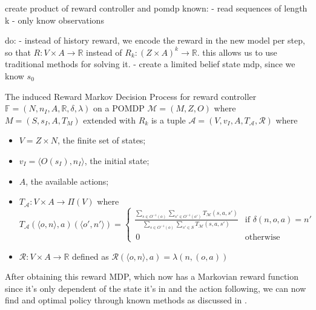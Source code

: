 create product of reward controller and pomdp
known:
- read sequences of length k
- only know observations

do:
- instead of history reward, we encode the reward in the new model per step, so that $R:V\times A\to \mathbb{R}$ instead of $R_k:(Z\times A)^k\to \mathbb{R}$. this allows us to use traditional methods for solving it.
- create a limited belief state mdp, since we know $s_0$ 

\begin{definition}
	\label{def:reward_machine}
	The induced Reward Markov Decision Process for reward controller $\mathbb{F}=(N, n_I, A, \mathbb{R}, \delta, \lambda)$ on a POMDP $\mathcal{M}=(M,Z,O)$ where $M=(S,s_I,A,T_{M})$ extended with $R_k$ is a tuple $\mathcal{A}=(V,v_I,A,T_\mathcal{A},\mathcal{R})$ where 
	\begin{itemize}
		\item $V=Z\times N$, the finite set of states;
		\item $v_I=\langle O(s_I),n_I\rangle $, the initial state;
		\item $A$, the available actions;
		\item $T_\mathcal{A}: V \times A\to \Pi(V)$ where
		\begin{equation*}
			T_\mathcal{A}(\langle o, n\rangle,a)(\langle o',n'\rangle)=
			\begin{cases}
				\frac{\sum\limits_{s\in O^{-1}(o)}\sum\limits_{s'\in O^{-1}(o')}T_{\mathcal{M}}(s,a,s')}{\sum\limits_{s\in O^{-1}(o)}\sum\limits_{s'\in S}T_{\mathcal{M}}(s,a,s')} &\text{if } \delta(n,o,a)=n' \\
				\, 0 & \text{otherwise}
			\end{cases}
		\end{equation*}
	\item $\mathcal{R}:V\times A\to\mathbb{R}$ defined as
		$\mathcal{R}(\langle o, n \rangle, a) = \lambda(n,(o,a))$
		\end{itemize}
\end{definition}

After obtaining this reward MDP, which now has a Markovian reward function since it's only dependent of the state it's in and the action following, we can now find and optimal policy through known methods as discussed in .


